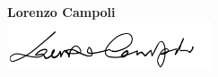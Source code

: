 \documentclass[12pt]{article}
\begin{document}

\vspace{\fill}
\begin{center}
    \hspace*{9cm} \LARGE \textbf{Lorenzo Campoli} \\
    \hspace*{9cm}\includegraphics[width=0.45\textwidth]{signature/signature0.png}
\end{center}
\vspace*{-1.0cm}
\end{document}
